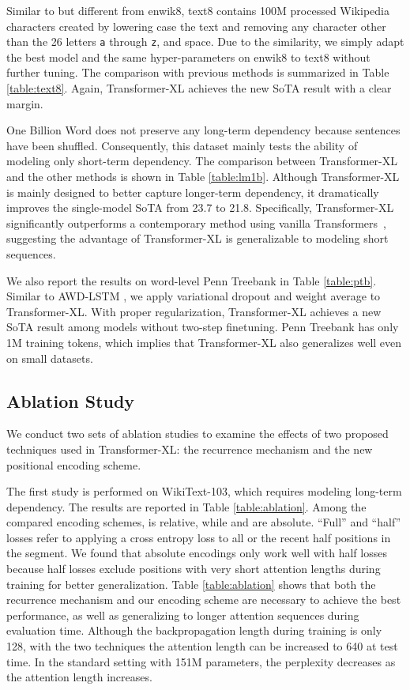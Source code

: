 \documentclass[11pt,a4paper]{article}
\begin{document}
Similar to but different from enwik8, text8 contains 100M processed Wikipedia characters created by lowering case the text and removing any character other than the 26 letters \texttt{a} through \texttt{z}, and space.
Due to the similarity, we simply adapt the best model and the same hyper-parameters on enwik8 to text8 without further tuning.
The comparison with previous methods is summarized in Table \ref{table:text8}.
Again, Transformer-XL achieves the new SoTA result with a clear margin.

One Billion Word does not preserve any long-term dependency because sentences have been shuffled. Consequently, this dataset mainly tests the ability of modeling only short-term dependency.
The comparison between Transformer-XL and the other methods is shown in Table \ref{table:lm1b}.
Although Transformer-XL is mainly designed to better capture longer-term dependency, it dramatically improves the single-model SoTA from 23.7 to 21.8.
Specifically, Transformer-XL significantly outperforms a contemporary method using vanilla Transformers~\cite{baevski2018adaptive}, suggesting the advantage of Transformer-XL is generalizable to modeling short sequences.



We also report the results on word-level Penn Treebank in Table \ref{table:ptb}. Similar to AWD-LSTM \citep{merity2017regularizing}, we apply variational dropout and weight average to Transformer-XL. With proper regularization, Transformer-XL achieves a new SoTA result among models without two-step finetuning. Penn Treebank has only 1M training tokens, which implies that Transformer-XL also generalizes well even on small datasets.

\subsection{Ablation Study}




We conduct two sets of ablation studies to examine the effects of two proposed techniques used in Transformer-XL: the recurrence mechanism and the new positional encoding scheme.


The first study is performed on WikiText-103, which requires modeling long-term dependency.
The results are reported in Table \ref{table:ablation}.
Among the compared encoding schemes, \citet{shaw2018self} is relative, while \citet{vaswani2017attention} and \citet{al2018character} are absolute. ``Full'' and ``half'' losses refer to applying a cross entropy loss to all or the recent half positions in the segment.
We found that absolute encodings only work well with half losses because half losses exclude positions with very short attention lengths during training for better generalization.
Table \ref{table:ablation} shows that both the recurrence mechanism and our encoding scheme are necessary to achieve the best performance, as well as generalizing to longer attention sequences during evaluation time. Although the backpropagation length during training is only 128, with the two techniques the attention length can be increased to 640 at test time. In the standard setting with 151M parameters, the perplexity decreases as the attention length increases.
\end{document}

